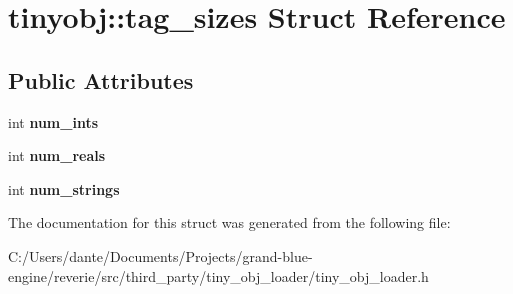 \hypertarget{structtinyobj_1_1tag__sizes}{}\section{tinyobj\+::tag\+\_\+sizes Struct Reference}
\label{structtinyobj_1_1tag__sizes}
\subsection*{Public Attributes}
\begin{DoxyCompactItemize}
\item 
\mbox{\label{structtinyobj_1_1tag__sizes_a0bd6e072f494c7c5a266367f89a850ae}} 
int {\bfseries num\+\_\+ints}
\item 
\mbox{\label{structtinyobj_1_1tag__sizes_a80e99873fe13e2bf0203253e6ce26476}} 
int {\bfseries num\+\_\+reals}
\item 
\mbox{\label{structtinyobj_1_1tag__sizes_acb2abbd496bdd3ea55f74d9968fd4b62}} 
int {\bfseries num\+\_\+strings}
\end{DoxyCompactItemize}


The documentation for this struct was generated from the following file\+:\begin{DoxyCompactItemize}
\item 
C\+:/\+Users/dante/\+Documents/\+Projects/grand-\/blue-\/engine/reverie/src/third\+\_\+party/tiny\+\_\+obj\+\_\+loader/tiny\+\_\+obj\+\_\+loader.\+h\end{DoxyCompactItemize}

